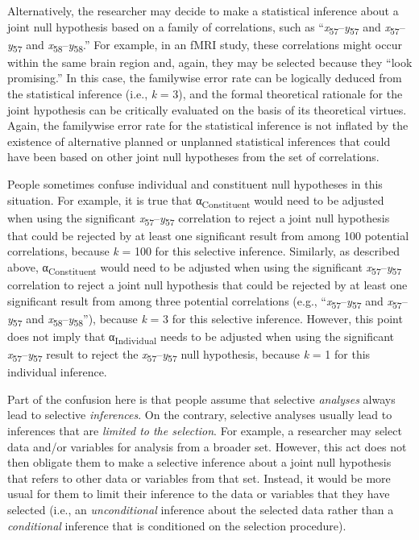 \documentclass[authordate, meta]{jote-new-article}
\begin{document}
	Alternatively, the researcher may decide to make a statistical inference about a joint null hypothesis based on a family of correlations, such as “\emph{x}\textsubscript{57}--\emph{y}\textsubscript{57} and \emph{x}\textsubscript{57}--\emph{y}\textsubscript{57} and \emph{x}\textsubscript{58}--\emph{y}\textsubscript{58}.” For example, in an fMRI study, these correlations might occur within the same brain region and, again, they may be selected because they “look promising.” In this case, the familywise error rate can be logically deduced from the statistical inference (i.e., \emph{k} = 3), and the formal theoretical rationale for the joint hypothesis can be critically evaluated on the basis of its theoretical virtues. Again, the familywise error rate for the statistical inference is not inflated by the existence of alternative planned or unplanned statistical inferences that could have been based on other joint null hypotheses from the set of correlations.



	People sometimes confuse individual and constituent null hypotheses in this situation. For example, it is true that α\textsubscript{Constituent} would need to be adjusted when using the significant \emph{x}\textsubscript{57}--\emph{y}\textsubscript{57} correlation to reject a joint null hypothesis that could be rejected by at least one significant result from among 100 potential correlations, because \emph{k} = 100 for this selective inference. Similarly, as described above, α\textsubscript{Constituent} would need to be adjusted when using the significant \emph{x}\textsubscript{57}--\emph{y}\textsubscript{57} correlation to reject a joint null hypothesis that could be rejected by at least one significant result from among three potential correlations (e.g., “\emph{x}\textsubscript{57}--\emph{y}\textsubscript{57} and \emph{x}\textsubscript{57}--\emph{y}\textsubscript{57} and \emph{x}\textsubscript{58}--\emph{y}\textsubscript{58}”), because \emph{k} = 3 for this selective inference. However, this point does not imply that α\textsubscript{Individual} needs to be adjusted when using the significant \emph{x}\textsubscript{57}--\emph{y}\textsubscript{57} result to reject the \emph{x}\textsubscript{57}--\emph{y}\textsubscript{57} null hypothesis, because \emph{k }= 1 for this individual inference.



	Part of the confusion here is that people assume that selective \emph{analyses} always lead to selective \emph{inferences}. On the contrary, selective analyses usually lead to inferences that are \emph{limited to the selection}. For example, a researcher may select data and/or variables for analysis from a broader set. However, this act does not then obligate them to make a selective inference about a joint null hypothesis that refers to other data or variables from that set. Instead, it would be more usual for them to limit their inference to the data or variables that they have selected (i.e., an \emph{unconditional} inference about the selected data rather than a \emph{conditional} inference that is conditioned on the selection procedure).
\end{document}
